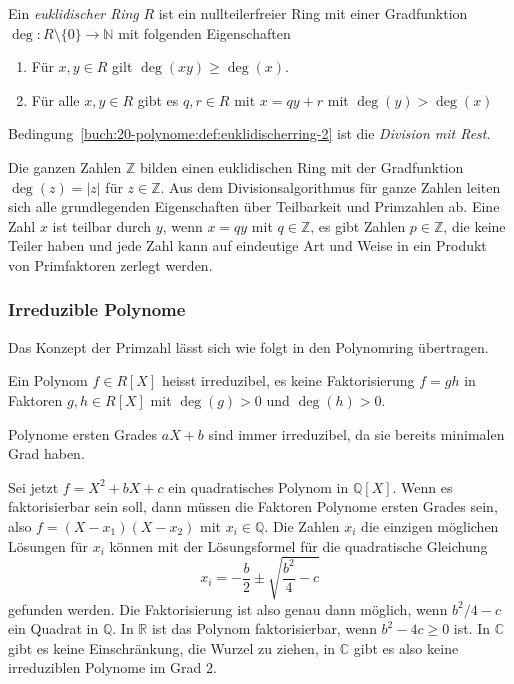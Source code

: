 \begin{definition}
Ein {\em euklidischer Ring} $R$ ist ein nullteilerfreier Ring mit einer
Gradfunktion $\deg\colon R\setminus\{0\}\to\mathbb{N}$ mit folgenden
Eigenschaften
\begin{enumerate}
\item Für $x,y\in R$ gilt $\deg(xy) \ge \deg(x)$.
\item Für alle $x,y\in R$ gibt es $q,r\in R$ mit $x=qy+r$ mit
$\deg(y)>\deg(x)$
\label{buch:20-polynome:def:euklidischerring-2}
\end{enumerate}
Bedingung~\ref{buch:20-polynome:def:euklidischerring-2} ist die
{\em Division mit Rest}.
%
%
%
\end{definition}

Die ganzen Zahlen $\mathbb{Z}$ bilden einen euklidischen Ring mit der 
Gradfunktion $\deg(z)=|z|$ für $z\in \mathbb{Z}$.
Aus dem Divisionsalgorithmus für ganze Zahlen leiten sich alle grundlegenden
Eigenschaften über Teilbarkeit und Primzahlen ab.
Eine Zahl $x$ ist teilbar durch $y$, wenn $x=qy$ mit $q\in \mathbb{Z}$,
es gibt Zahlen $p\in\mathbb{Z}$, die keine Teiler haben und jede Zahl
kann auf eindeutige Art und Weise in ein Produkt von Primfaktoren
zerlegt werden.

\subsubsection{Irreduzible Polynome}
Das Konzept der Primzahl lässt sich wie folgt in den Polynomring übertragen.

\begin{definition}
Ein Polynom $f\in R[X]$ heisst irreduzibel, es keine Faktorisierung $f=gh$
in Faktoren $g,h\in R[X]$ mit $\deg(g)>0$ und $\deg(h) >0$.
\end{definition}

\begin{beispiel}
Polynome ersten Grades $aX+b$ sind immer irreduzibel, da sie bereits
minimalen Grad haben.

Sei jetzt $f=X^2+bX+c$ ein quadratisches Polynom in $\mathbb{Q}[X]$.
Wenn es faktorisierbar sein soll, dann müssen die Faktoren Polynome
ersten Grades sein, also $f=(X-x_1)(X-x_2)$ mit $x_i\in\mathbb{Q}$.
Die Zahlen $x_i$ die einzigen möglichen Lösungen für $x_i$ können mit
der Lösungsformel für die quadratische Gleichung
\[
x_i = -\frac{b}2\pm\sqrt{\frac{b^2}{4}-c}
\]
gefunden werden.
Die Faktorisierung ist also genau dann möglich, wenn $b^2/4-c$ ein 
Quadrat in $\mathbb{Q}$.
In $\mathbb{R}$ ist das Polynom faktorisierbar, wenn $b^2-4c\ge 0$ ist.
In $\mathbb{C}$ gibt es keine Einschränkung, die Wurzel zu ziehen,
in $\mathbb{C}$ gibt es also keine irreduziblen Polynome im Grad $2$.
\end{beispiel}

